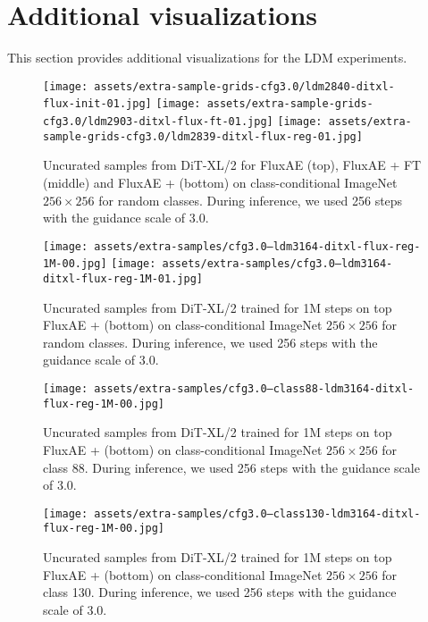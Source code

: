\section{Additional visualizations}
\label{ap:visualizations}

This section provides additional visualizations for the LDM experiments.

\begin{figure*}[h]
\centering
\texttt{[image: assets/extra-sample-grids-cfg3.0/ldm2840-ditxl-flux-init-01.jpg]}
\texttt{[image: assets/extra-sample-grids-cfg3.0/ldm2903-ditxl-flux-ft-01.jpg]}
\texttt{[image: assets/extra-sample-grids-cfg3.0/ldm2839-ditxl-flux-reg-01.jpg]}
\caption{Uncurated samples from DiT-XL/2 for FluxAE (top), FluxAE + FT (middle) and FluxAE + \regshortname (bottom) on class-conditional ImageNet $256 \times 256$ for random classes. During inference, we used 256 steps with the guidance scale of 3.0.}
\label{fig:ap:extra-samples-ditxl-flux}
\end{figure*}

\begin{figure*}[h]
\centering
\texttt{[image: assets/extra-samples/cfg3.0--ldm3164-ditxl-flux-reg-1M-00.jpg]}
\texttt{[image: assets/extra-samples/cfg3.0--ldm3164-ditxl-flux-reg-1M-01.jpg]}
\caption{Uncurated samples from DiT-XL/2 trained for 1M steps on top FluxAE + \regshortname (bottom) on class-conditional ImageNet $256 \times 256$ for random classes. During inference, we used 256 steps with the guidance scale of 3.0.}
\label{fig:ap:extra-samples-ditxl-flux-1m}
\end{figure*}

\begin{figure*}[h]
\centering
\texttt{[image: assets/extra-samples/cfg3.0--class88-ldm3164-ditxl-flux-reg-1M-00.jpg]}
\caption{Uncurated samples from DiT-XL/2 trained for 1M steps on top FluxAE + \regshortname (bottom) on class-conditional ImageNet $256 \times 256$ for class 88. During inference, we used 256 steps with the guidance scale of 3.0.}
\label{fig:ap:extra-samples-ditxl-flux-1m-class-88}
\end{figure*}

\begin{figure*}[h]
\centering
\texttt{[image: assets/extra-samples/cfg3.0--class130-ldm3164-ditxl-flux-reg-1M-00.jpg]}
\caption{Uncurated samples from DiT-XL/2 trained for 1M steps on top FluxAE + \regshortname (bottom) on class-conditional ImageNet $256 \times 256$ for class 130. During inference, we used 256 steps with the guidance scale of 3.0.}
\label{fig:ap:extra-samples-ditxl-flux-1m-class-130}
\end{figure*}

